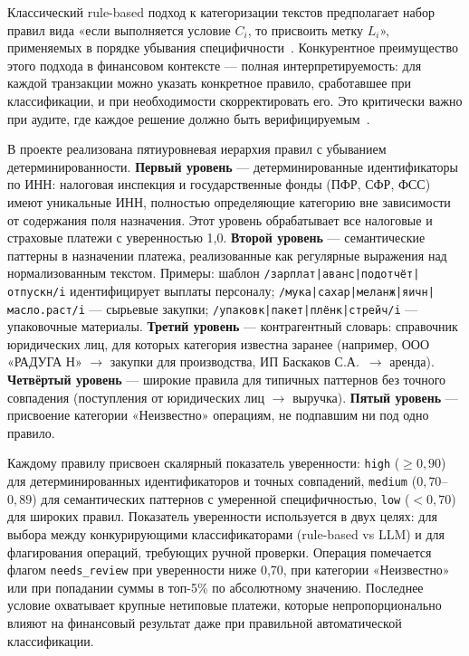 Классический rule-based подход к категоризации текстов предполагает набор правил вида «если выполняется условие $C_i$, то присвоить метку $L_i$», применяемых в порядке убывания специфичности~\cite{Cohen1995}. Конкурентное преимущество этого подхода в финансовом контексте --- полная интерпретируемость: для каждой транзакции можно указать конкретное правило, сработавшее при классификации, и при необходимости скорректировать его. Это критически важно при аудите, где каждое решение должно быть верифицируемым~\cite{whittington2012principles}.

В проекте реализована пятиуровневая иерархия правил с убыванием детерминированности. \textbf{Первый уровень} --- детерминированные идентификаторы по ИНН: налоговая инспекция и государственные фонды (ПФР, СФР, ФСС) имеют уникальные ИНН, полностью определяющие категорию вне зависимости от содержания поля назначения. Этот уровень обрабатывает все налоговые и страховые платежи с уверенностью 1,0. \textbf{Второй уровень} --- семантические паттерны в назначении платежа, реализованные как регулярные выражения над нормализованным текстом. Примеры: шаблон \texttt{/зарплат|аванс|подотчёт|отпускн/i} идентифицирует выплаты персоналу; \texttt{/мука|сахар|меланж|яичн|масло.раст/i} --- сырьевые закупки; \texttt{/упаковк|пакет|плёнк|стрейч/i} --- упаковочные материалы. \textbf{Третий уровень} --- контрагентный словарь: справочник юридических лиц, для которых категория известна заранее (например, ООО «РАДУГА Н» $\to$ закупки для производства, ИП Баскаков С.А.\ $\to$ аренда). \textbf{Четвёртый уровень} --- широкие правила для типичных паттернов без точного совпадения (поступления от юридических лиц $\to$ выручка). \textbf{Пятый уровень} --- присвоение категории «Неизвестно» операциям, не подпавшим ни под одно правило.

Каждому правилу присвоен скалярный показатель уверенности: \texttt{high} ($\geq 0{,}90$) для детерминированных идентификаторов и точных совпадений, \texttt{medium} ($0{,}70$--$0{,}89$) для семантических паттернов с умеренной специфичностью, \texttt{low} ($< 0{,}70$) для широких правил. Показатель уверенности используется в двух целях: для выбора между конкурирующими классификаторами (rule-based vs LLM) и для флагирования операций, требующих ручной проверки. Операция помечается флагом \texttt{needs\_review} при уверенности ниже 0,70, при категории «Неизвестно» или при попадании суммы в топ-5\% по абсолютному значению. Последнее условие охватывает крупные нетиповые платежи, которые непропорционально влияют на финансовый результат даже при правильной автоматической классификации.

